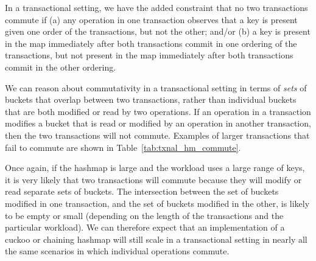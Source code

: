 In a transactional setting, we have the added constraint that no two transactions commute if (a) any operation in one transaction observes that a key is present given one order of the transactions, but not the other; and/or (b) a key is present in the map immediately after both transactions commit in one ordering of the transactions, but not present in the map immediately after both transactions commit in the other ordering.

We can reason about commutativity in a transactional setting in terms of \emph{sets} of buckets that overlap between two transactions, rather than individual buckets that are both modified or read by two operations. If an operation in a transaction modifies a bucket that is read or modified by an operation in another transaction, then the two transactions will not commute.
Examples of larger transactions that fail to commute are shown in Table~\ref{tab:txnal_hm_commute}.

Once again, if the hashmap is large and the workload uses a large range of keys, it is very likely that two transactions will commute because they will modify or read separate sets of buckets. 
The intersection between the set of buckets modified in one transaction, and the set of buckets modified in the other, is likely to be empty or small (depending on the length of the transactions and the particular workload). We can therefore expect that an implementation of a cuckoo or chaining hashmap will still scale in a transactional setting in nearly all the same scenarios in which individual operations commute. 

